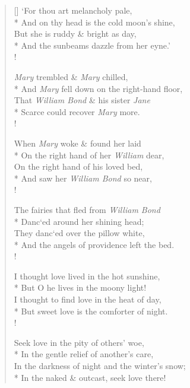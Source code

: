\documentclass[MAIN]{subfiles}
\begin{document}
\begin{verse}[\versewidth]
`For thou art melancholy pale,\\*
\vin And on thy head is the cold moon's shine,\\
But she is ruddy \& bright as day,\\*
\vin And the sunbeams dazzle from her eyne.'\\!

\emph{Mary} trembled \& \emph{Mary} chilled,\\*
\vin And \emph{Mary} fell down on the right-hand floor,\\
That \emph{William Bond} \& his sister \emph{Jane}\\*
\vin Scarce could recover \emph{Mary} more.\\!

When \emph{Mary} woke \& found her laid\\*
\vin On the right hand of her \emph{William} dear,\\
On the right hand of his loved bed,\\*
\vin And saw her \emph{William Bond} so near,\\!

The fairies that fled from \emph{William Bond}\\*
\vin Danc`ed around her shining head;\\
They danc`ed over the pillow white,\\*
\vin And the angels of providence left the bed.\\!

I thought love lived in the hot sunshine,\\*
\vin But O he lives in the moony light!\\
I thought to find love in the heat of day,\\*
\vin But sweet love is the comforter of night.\\!

Seek love in the pity of others' woe,\\*
\vin In the gentle relief of another's care,\\
In the darkness of night and the winter's snow;\\*
\vin In the naked \& outcast, seek love there!
\end{verse}
\end{document}
